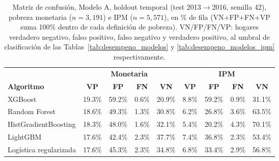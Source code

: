 \begin{table}[H]
  \centering
  \caption{Matriz de confusión, Modelo A, holdout temporal (test
  2013$\to$2016, semilla 42), pobreza monetaria ($n=3{,}191$) e
  IPM ($n=5{,}571$), en \% de fila (VN+FP+FN+VP suma 100\% dentro de
  cada definición de pobreza). VN/FP/FN/VP: hogares verdadero
  negativo, falso positivo, falso negativo y verdadero positivo, al
  umbral de clasificación de las Tablas~\ref{tab:desempeno_modelos} y
  \ref{tab:desempeno_modelos_ipm} respectivamente.}
  \label{tab:matriz_confusion_a_pct}
  \footnotesize
  \setlength{\tabcolsep}{4pt}
  \begin{tabular}{lcccccccc}
    \toprule
     & \multicolumn{4}{c}{\textbf{Monetaria}} & \multicolumn{4}{c}{\textbf{IPM}} \\
    \cmidrule(lr){2-5} \cmidrule(lr){6-9}
    \textbf{Algoritmo} & \textbf{VP} & \textbf{FP} & \textbf{FN} & \textbf{VN} & \textbf{VP} & \textbf{FP} & \textbf{FN} & \textbf{VN} \\
    \midrule
    XGBoost                  & 19.3\% & 59.2\% & 0.6\% & 20.9\% & 8.8\% & 59.2\% & 0.9\% & 31.1\% \\
    Random Forest            & 18.6\% & 49.3\% & 1.3\% & 30.8\% & 6.2\% & 26.8\% & 3.6\% & 63.5\% \\
    HistGradientBoosting     & 18.3\% & 48.0\% & 1.6\% & 32.1\% & 5.4\% & 20.2\% & 4.3\% & 70.1\% \\
    LightGBM                 & 17.6\% & 42.4\% & 2.3\% & 37.7\% & 7.4\% & 36.8\% & 2.3\% & 53.4\% \\
    Logística regularizada   & 17.6\% & 45.3\% & 2.3\% & 34.8\% & 6.8\% & 33.4\% & 2.9\% & 56.8\% \\
    \bottomrule
  \end{tabular}
\end{table}
